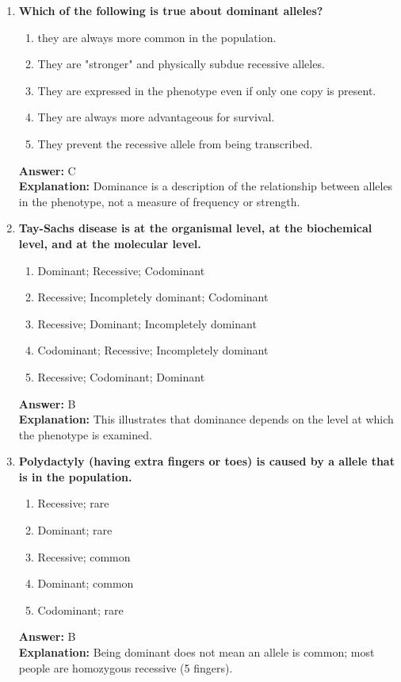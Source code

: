 \documentclass[11pt, a4paper]{article}
\begin{document}
\begin{enumerate}[leftmargin=*, label=\arabic*.]
\item \textbf{Which of the following is true about dominant alleles?}
\begin{enumerate}[label=\Alph*.]
\item they are always more common in the population.
\item They are "stronger" and physically subdue recessive alleles.
\item They are expressed in the phenotype even if only one copy is present.
\item They are always more advantageous for survival.
\item They prevent the recessive allele from being transcribed.
\end{enumerate}
\textbf{Answer:} C \\
\textbf{Explanation:} Dominance is a description of the relationship between alleles in the phenotype, not a measure of frequency or strength.

\item \textbf{Tay-Sachs disease is \underline{\hspace{1cm}} at the organismal level, \underline{\hspace{1cm}} at the biochemical level, and \underline{\hspace{1cm}} at the molecular level.}
\begin{enumerate}[label=\Alph*.]
\item Dominant; Recessive; Codominant
\item Recessive; Incompletely dominant; Codominant
\item Recessive; Dominant; Incompletely dominant
\item Codominant; Recessive; Incompletely dominant
\item Recessive; Codominant; Dominant
\end{enumerate}
\textbf{Answer:} B \\
\textbf{Explanation:} This illustrates that dominance depends on the level at which the phenotype is examined.

\item \textbf{Polydactyly (having extra fingers or toes) is caused by a \underline{\hspace{1cm}} allele that is \underline{\hspace{1cm}} in the population.}
\begin{enumerate}[label=\Alph*.]
\item Recessive; rare
\item Dominant; rare
\item Recessive; common
\item Dominant; common
\item Codominant; rare
\end{enumerate}
\textbf{Answer:} B \\
\textbf{Explanation:} Being dominant does not mean an allele is common; most people are homozygous recessive (5 fingers).


\end{enumerate}
\end{document}
